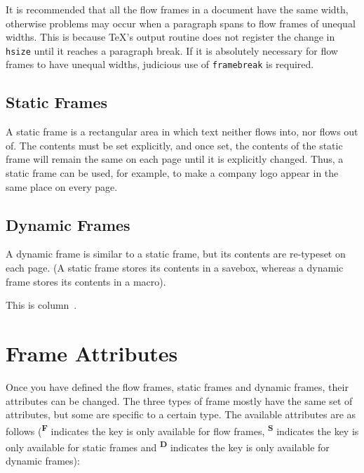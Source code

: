 \documentclass[a4paper]{report}
\providecommand{\cmdname}[1]{\texttt{\symbol{92}#1}}
\begin{document}
It is recommended that all the flow frames in a document
have the same width, otherwise problems may occur
when a paragraph spans to flow frames of unequal
widths. This is because \TeX's output routine does not
register the change in \cmdname{hsize} until it reaches
a paragraph break. If it is absolutely necessary for 
flow frames to have unequal widths, judicious use of
\cmdname{framebreak} is required.

\section*{Static Frames}

A static frame is a rectangular area in which text neither
flows into, nor flows out of.  The contents must be set
explicitly, and once set, the contents of the static frame will
remain the same on each page until it is explicitly 
changed.  Thus, a static frame can be used, for example, to make 
a company logo appear in the same place on every page.

\section*{Dynamic Frames}

A dynamic frame is similar to a static frame, but its contents
are re-typeset on each page. (A static frame stores its 
contents in a savebox, whereas a dynamic frame stores its
contents in a macro).

This is column~\thedisplayedframe.

\chapter{Frame Attributes}
\label{sec:modattr}

Once you have defined the {flow frames}, {static frames} and 
{dynamic frames}, their attributes can be changed. 
The three types of frame mostly have the 
same set of attributes, but some are specific to a certain type.
The available attributes are as follows
(\textsuperscript{\textbf{F}} indicates the key is
only available for {flow frames}, 
\textsuperscript{\textbf{S}} indicates the key is only available 
for {static frames}
and \textsuperscript{\textbf{D}} indicates the key
is only available for {dynamic frames}):
\end{document}
